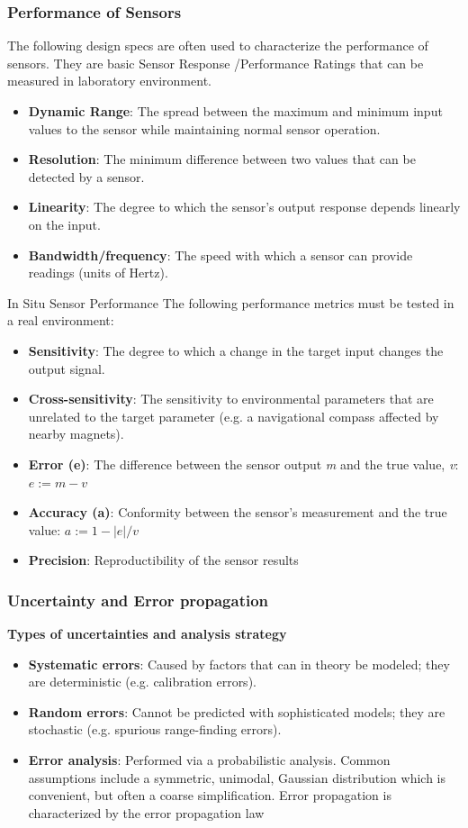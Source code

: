 \subsubsection{Performance of Sensors}


The following design specs are often used to characterize the performance of sensors. They are basic Sensor Response /Performance Ratings that can be measured in laboratory environment.
\begin{itemize}
  \item \textbf{Dynamic Range}: The spread between the maximum and minimum input values to the sensor while maintaining normal sensor operation.
  \item \textbf{Resolution}: The minimum difference between two values that can be detected by a sensor.
  \item \textbf{Linearity}: The degree to which the sensor's output response depends linearly on the input.
 \item \textbf{Bandwidth/frequency}: The speed with which a sensor can provide readings (units of Hertz).
\end{itemize}

In Situ Sensor Performance
The following performance metrics must be tested in a real environment:
\begin{itemize}
  \item \textbf{Sensitivity}: The degree to which a change in the target input changes the output signal.
  \item \textbf{Cross-sensitivity}: The sensitivity to environmental parameters that are unrelated to the target parameter (e.g. a navigational compass affected by nearby magnets).
  \item \textbf{Error (e)}: The difference between the sensor output \textit{m} and the true value, \textit{v}: $e:=m-v$
 \item \textbf{Accuracy (a)}: Conformity between the sensor's measurement and the true value: $a:=1-|e|/v$
 \item \textbf{Precision}: Reproductibility of the sensor results
\end{itemize}

\subsubsection{Uncertainty and Error propagation}
\textbf{Types of uncertainties and analysis strategy}
\begin{itemize}
    \item \textbf{Systematic errors}: Caused by factors that can in theory be modeled; they are deterministic (e.g. calibration errors).
    \item \textbf{Random errors}: Cannot be predicted with sophisticated models; they are stochastic (e.g. spurious range-finding errors).
    \item \textbf{Error analysis}: Performed via a probabilistic analysis. Common assumptions include a symmetric, unimodal, Gaussian distribution which is convenient, but often a coarse simplification. Error propagation is characterized by the error propagation law
\end{itemize}

